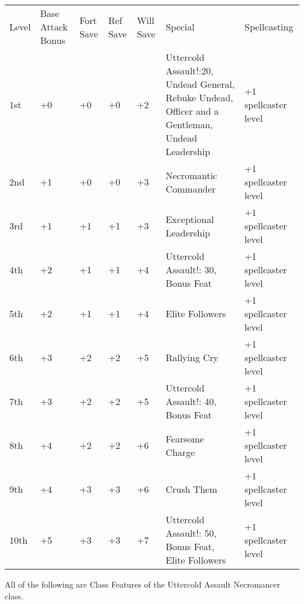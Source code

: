 



\begin{table}[tbh]
\begin{small}
\begin{tabular}{lp{1.9cm}p{0.7cm}p{0.7cm}p{0.7cm}p{6cm}l}
Level  &Base Attack Bonus &Fort Save &Ref Save &Will Save &Special &Spellcasting\\
1st &+0 &+0 &+0 &+2 &Uttercold Assault!:20, Undead General, Rebuke Undead, Officer and a Gentleman, Undead Leadership &+1 spellcaster level\\
2nd &+1 &+0 &+0 &+3 &Necromantic Commander &+1 spellcaster level\\
3rd &+1 &+1 &+1 &+3 &Exceptional Leadership &+1 spellcaster level\\
4th &+2 &+1 &+1 &+4 &Uttercold Assault!: 30, Bonus Feat &+1 spellcaster level\\
5th &+2 &+1 &+1 &+4 &Elite Followers &+1 spellcaster level\\
6th &+3 &+2 &+2 &+5 &Rallying Cry &+1 spellcaster level\\
7th &+3 &+2 &+2 &+5 &Uttercold Assault!: 40, Bonus Feat &+1 spellcaster level\\
8th &+4 &+2 &+2 &+6 &Fearsome Charge &+1 spellcaster level\\
9th &+4 &+3 &+3 &+6 &Crush Them &+1 spellcaster level\\
10th &+5 &+3 &+3 &+7 &Uttercold Assault!: 50, Bonus Feat, Elite Followers &+1 spellcaster level\\
\end{tabular}
\end{small}
\end{table}

\smallskip\noindent All of the following are Class Features of the Uttercold Assault Necromancer class.



